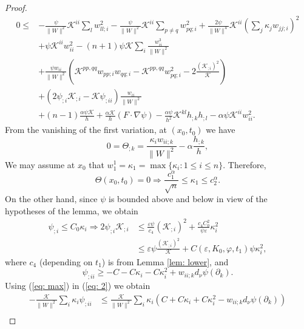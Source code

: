 \documentclass{amsart}
\theoremstyle{definition}
\theoremstyle{remark}
\numberwithin{equation}{section}
\begin{document}
\begin{proof}
\begin{align*}
0 \leq& -\frac{\psi}{\|W\|^2} \mathcal{K}^{ii} \sum_lw_{ll;i}^2 - \frac{\psi}{\|W\|^2} \mathcal{K}^{ii} \sum_{p\ne q}w_{pq;i}^2 + \frac{2\psi}{\|W\|^4} \mathcal{K}^{ii} \left(\sum_j\kappa_jw_{jj;i}\right)^2 \\
&+ \psi\mathcal{K}^{ii} w_{ii}^2 -(n+1) \psi \mathcal{K} \sum_i\frac{w_{ii}^3}{\|W\|^2} \\
&+ \frac{\psi w_{ii}}{\|W\|^2} \left(\mathcal{K}^{pp,qq}w_{pp;i}w_{qq;i} - \mathcal{K}^{pp,qq}w_{pq;i}^2 - 2\frac{(\mathcal{K}_{;i})^2}{\mathcal{K}}\right) \\
&+ (2\psi_{;i}\mathcal{K}_{;i} - \mathcal{K}\psi_{;ii}) \frac{w_{ii}}{\|W\|^2} \\
&+ (n-1) \frac{\alpha\psi\mathcal{K}}{h} + \frac{\alpha\mathcal{K}}{h}(F\cdot\nabla\psi) - \frac{\alpha\psi}{h^2}\mathcal{K}^{kl} h_{;k} h_{;l} - \alpha\psi\mathcal{K}^{ii}w_{ii}^2.
\end{align*}
From the vanishing of the first variation, at $(x_0,t_0)$ we have
\begin{equation}\label{eq: max}
0 = \Theta_{;k} = \frac{\kappa_iw_{ii;k}}{\|W\|^2} - \alpha\frac{h_{;k}}{h},
\end{equation}
We may assume at $x_0$ that $w_1^1=\kappa_1=\max\{\kappa_i:1\leq i\leq n\}.$ Therefore,
\begin{equation}\label{eq: max1}
\Theta(x_0,t_0)=0\Rightarrow\frac{c_1^{\alpha}}{\sqrt{n}}\leq \kappa_1\leq c_2^{\alpha}.
\end{equation}
On the other hand, since $\psi$ is bounded above and below in view of the hypotheses of the lemma, we obtain
\begin{align}\label{eq: 1}
\psi_{;i} \leq C_0\kappa_i \Rightarrow 2\psi_{;i} \mathcal{K}_{;i}&\leq \frac{\varepsilon\psi}{c_4} (\mathcal{K}_{;i})^2 + \frac{c_4C_0^2}{\psi\varepsilon}\kappa_i^2\nonumber\\
&\leq \varepsilon\psi \frac{(\mathcal{K}_{;i})^2}{\mathcal{K}} + C(\varepsilon,K_0,\varphi,t_1) \psi\kappa_i^2,
\end{align}
where $c_4$ (depending on $t_1$) is from Lemma \ref{lem: lower},
and
\begin{equation}\label{eq: 2}
\psi_{;ii} \geq - C - C\kappa_i - C\kappa_i^2 + w_{ii;k} d_{\nu} \psi(\partial_k).
\end{equation}
Using (\ref{eq: max}) in (\ref{eq: 2}) we obtain
\begin{align}\label{eq: 3}
-\frac{\mathcal{K}}{\|W\|^2}\sum_i\kappa_i \psi_{;ii}&\leq \frac{\mathcal{K}}{\|W\|^2}\sum_i \kappa_i(C+C\kappa_i+C\kappa_i^2-w_{ii;k}d_{\nu}\psi(\partial_k))\nonumber\\

\end{align}
\end{proof}
\end{document}

